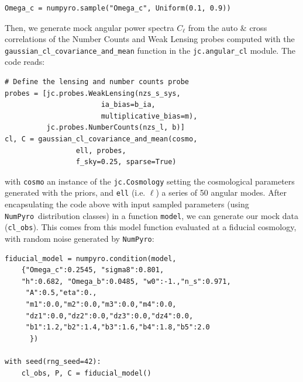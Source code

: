 \documentclass[twocolumn,twocolappendix,nofootinbib,iop]{openjournal}
\newcommand{\numpyro}{\texttt{NumPyro}}
\begin{document}
\begin{lstlisting}[language=iPython]
Omega_c = numpyro.sample("Omega_c", Uniform(0.1, 0.9))
\end{lstlisting}

Then, we generate mock angular power spectra $C_\ell$ from the auto \& cross correlations of the Number Counts and Weak Lensing probes computed with the \texttt{gaussian\_cl\_covariance\_and\_mean} function in the \texttt{jc.angular\_cl} module. The code reads:
\begin{lstlisting}[language=iPython]
# Define the lensing and number counts probe
probes = [jc.probes.WeakLensing(nzs_s_sys, 
                       ia_bias=b_ia,
                       multiplicative_bias=m),
          jc.probes.NumberCounts(nzs_l, b)]
cl, C = gaussian_cl_covariance_and_mean(cosmo, 
                 ell, probes, 
                 f_sky=0.25, sparse=True)
\end{lstlisting}

with \texttt{cosmo} an instance of the \texttt{jc.Cosmology} setting the cosmological parameters generated with the priors, and \texttt{ell} (i.e. $\ell$) a series of 50 angular modes. After encapsulating the code above with input sampled parameters (using \numpyro\ distribution classes) in a function \texttt{model}, we can generate our mock data (\texttt{cl\_obs}). This comes from this model function evaluated at a fiducial cosmology, with random noise generated by \numpyro:

\begin{lstlisting}[language=iPython]
fiducial_model = numpyro.condition(model,
    {"Omega_c":0.2545, "sigma8":0.801, 
    "h":0.682, "Omega_b":0.0485, "w0":-1.,"n_s":0.971,
     "A":0.5,"eta":0.,
     "m1":0.0,"m2":0.0,"m3":0.0,"m4":0.0,
     "dz1":0.0,"dz2":0.0,"dz3":0.0,"dz4":0.0,
     "b1":1.2,"b2":1.4,"b3":1.6,"b4":1.8,"b5":2.0
      })

with seed(rng_seed=42):
    cl_obs, P, C = fiducial_model()
\end{lstlisting}

\end{document}
